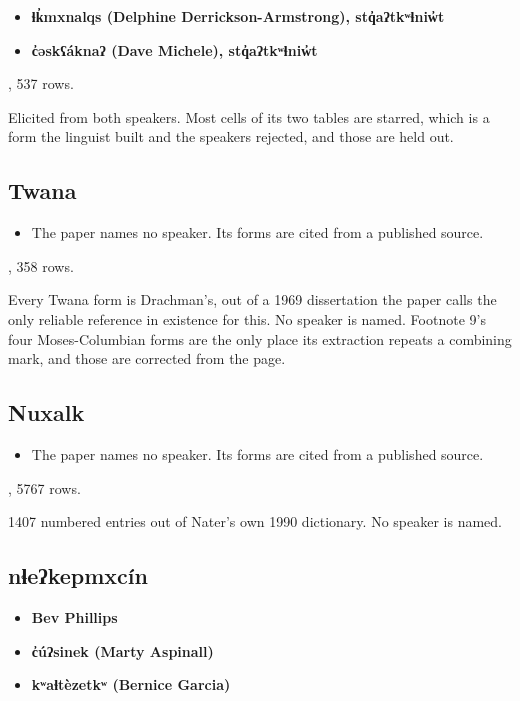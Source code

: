 \begin{itemize}
\item \textbf{ɬk̓mxnalqs (Delphine Derrickson-Armstrong), stq̓aʔtkʷɬniw̓t}
\item \textbf{c̓əskʕáknaʔ (Dave Michele), stq̓aʔtkʷɬniw̓t}
\end{itemize}

\cite{src:Lyon-2025}, 537 rows.

Elicited from both speakers. Most cells of its two tables are starred, which is a form the linguist built and the speakers rejected, and those are held out.

\subsection{Twana}

\begin{itemize}
\item The paper names no speaker. Its forms are cited from a published source.
\end{itemize}

\cite{src:Kim-2017}, 358 rows.

Every Twana form is Drachman's, out of a 1969 dissertation the paper calls the only reliable reference in existence for this. No speaker is named. Footnote 9's four Moses-Columbian forms are the only place its extraction repeats a combining mark, and those are corrected from the page.

\subsection{Nuxalk}

\begin{itemize}
\item The paper names no speaker. Its forms are cited from a published source.
\end{itemize}

\cite{src:Nater-2013}, 5767 rows.

1407 numbered entries out of Nater's own 1990 dictionary. No speaker is named.

\subsection{nɬeʔkepmxcín}

\begin{itemize}
\item \textbf{Bev Phillips}
\item \textbf{c̓úʔsinek (Marty Aspinall)}
\item \textbf{kʷaɬtèzetkʷ (Bernice Garcia)}
\end{itemize}

